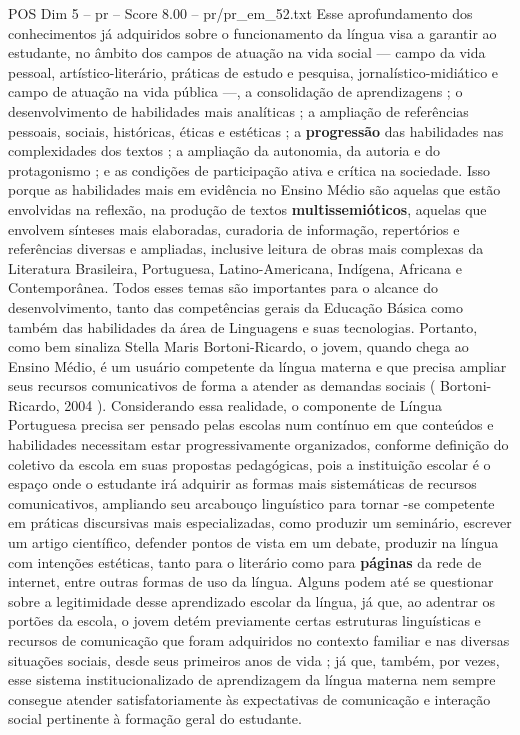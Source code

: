 \begin{textsample}{POS Dim 5 – pr – Score 8.00 – pr/pr\_em\_52.txt}
Esse aprofundamento dos conhecimentos já adquiridos sobre o funcionamento da língua visa a garantir ao estudante, no âmbito dos campos de atuação na vida social — campo da vida pessoal, artístico-literário, práticas de estudo e pesquisa, jornalístico-midiático e campo de atuação na vida pública —, a consolidação de aprendizagens ; o desenvolvimento de habilidades mais analíticas ; a ampliação de referências pessoais, sociais, históricas, éticas e estéticas ; a \textbf{progressão} das habilidades nas complexidades dos textos ; a ampliação da autonomia, da autoria e do protagonismo ; e as condições de participação ativa e crítica na sociedade.
Isso porque as habilidades mais em evidência no Ensino Médio são aquelas que estão envolvidas na reflexão, na produção de textos \textbf{multissemióticos}, aquelas que envolvem sínteses mais elaboradas, curadoria de informação, repertórios e referências diversas e ampliadas, inclusive leitura de obras mais complexas da Literatura Brasileira, Portuguesa, Latino-Americana, Indígena, Africana e Contemporânea.
Todos esses temas são importantes para o alcance do desenvolvimento, tanto das competências gerais da Educação Básica como também das habilidades da área de Linguagens e suas tecnologias.
Portanto, como bem sinaliza Stella Maris Bortoni-Ricardo, o jovem, quando chega ao Ensino Médio, é um usuário competente da língua materna e que precisa ampliar seus recursos comunicativos de forma a atender as demandas sociais ( Bortoni-Ricardo, 2004 ).
Considerando essa realidade, o componente de Língua Portuguesa precisa ser pensado pelas escolas num contínuo em que conteúdos e habilidades necessitam estar progressivamente organizados, conforme definição do coletivo da escola em suas propostas pedagógicas, pois a instituição escolar é o espaço onde o estudante irá adquirir as formas mais sistemáticas de recursos comunicativos, ampliando seu arcabouço linguístico para tornar -se competente em práticas discursivas mais especializadas, como produzir um seminário, escrever um artigo científico, defender pontos de vista em um debate, produzir na língua com intenções estéticas, tanto para o literário como para \textbf{páginas} da rede de internet, entre outras formas de uso da língua.
Alguns podem até se questionar sobre a legitimidade desse aprendizado escolar da língua, já que, ao adentrar os portões da escola, o jovem detém previamente certas estruturas linguísticas e recursos de comunicação que foram adquiridos no contexto familiar e nas diversas situações sociais, desde seus primeiros anos de vida ; já que, também, por vezes, esse sistema institucionalizado de aprendizagem da língua materna nem sempre consegue atender satisfatoriamente às expectativas de comunicação e interação social pertinente à formação geral do estudante.

\end{textsample}
